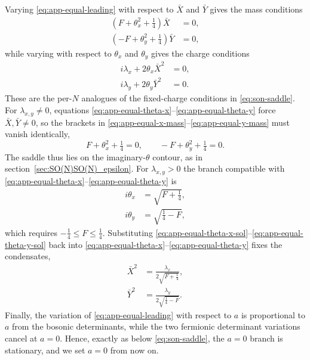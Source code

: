 \documentclass[a4paper,11pt]{article}
\begin{document}
\begin{appendix}
Varying \eqref{eq:app-equal-leading} with respect to $\bar{X}$ and $\bar{Y}$ gives the mass conditions
\begin{align}
\left(F+\theta_x^2+\tfrac14\right)\bar{X}&=0,
\label{eq:app-equal-x-mass}\\
\left(-F+\theta_y^2+\tfrac14\right)\bar{Y}&=0,
\label{eq:app-equal-y-mass}
\end{align}
while varying with respect to $\theta_x$ and $\theta_y$ gives the charge conditions
\begin{align}
i \lambda_x+2\theta_x\bar{X}^2&=0,
\label{eq:app-equal-theta-x}\\
i \lambda_y+2\theta_y\bar{Y}^2&=0.
\label{eq:app-equal-theta-y}
\end{align}
These are the per-$N$ analogues of the fixed-charge conditions in \eqref{eq:son-saddle}. For $\lambda_{x,y}\neq 0$, equations \eqref{eq:app-equal-theta-x}--\eqref{eq:app-equal-theta-y} force $\bar{X},\bar{Y}\neq 0$, so the brackets in \eqref{eq:app-equal-x-mass}--\eqref{eq:app-equal-y-mass} must vanish identically,
\begin{equation}
  F+\theta_x^2+\tfrac14=0, \qquad -F+\theta_y^2+\tfrac14=0. \label{eq:app-equal-mass-zero}
\end{equation}
The saddle thus lies on the imaginary-$\theta$ contour, as in section~\ref{sec:SO(N)SO(N)_epsilon}. For $\lambda_{x,y}>0$ the branch compatible with \eqref{eq:app-equal-theta-x}--\eqref{eq:app-equal-theta-y} is
\begin{align}
i\theta_x&=\sqrt{F+\tfrac14},
\label{eq:app-equal-theta-x-sol}\\
i\theta_y&=\sqrt{\tfrac14-F},
\label{eq:app-equal-theta-y-sol}
\end{align}
which requires $-\tfrac14\leq F\leq\tfrac14$. Substituting \eqref{eq:app-equal-theta-x-sol}--\eqref{eq:app-equal-theta-y-sol} back into \eqref{eq:app-equal-theta-x}--\eqref{eq:app-equal-theta-y} fixes the condensates,
\begin{align}
\bar{X}^2&=\frac{\lambda_x}{2\sqrt{F+\frac14}},
\label{eq:app-equal-xbar}\\
\bar{Y}^2&=\frac{\lambda_y}{2\sqrt{\frac14-F}}.
\label{eq:app-equal-ybar}
\end{align}
Finally, the variation of \eqref{eq:app-equal-leading} with respect to $a$ is proportional to $a$ from the bosonic determinants, while the two fermionic determinant variations cancel at $a=0$. Hence, exactly as below \eqref{eq:son-saddle}, the $a=0$ branch is stationary, and we set $a=0$ from now on.


\end{appendix}
\end{document}
